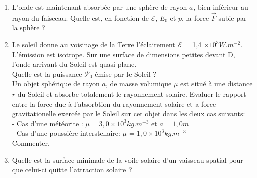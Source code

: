 \documentclass{article}
\begin{document}
\begin{enumerate}
\begin{enumerate}
    \item L'onde est maintenant absorbée par une sphère de rayon $a$, bien inférieur au rayon du faisceau. Quelle est, en fonction de $\mathcal{E}$, $E_0$ et $p$, la force $\vec{F}$ subie par la sphère ? 
    \item Le soleil donne au voisinage de la Terre l'éclairement $\mathcal{E}$ = 1,4 $\times 10^3 W.m^{-2}$. L'émission est isotrope. Sur une surface de dimensions petites devant D, l'onde arrivant du Soleil est quasi plane. \\
    Quelle est la puissance $\mathcal{P_0}$ émise par le Soleil ? \\
    Un objet sphérique de rayon $a$, de masse volumique $\mu$ est situé à une distance $r$ du Soleil et absorbe totalement le rayonnement solaire. Evaluer le rapport entre la force due à l'absorbtion du rayonnement solaire et a force gravitationelle exercée par le Soleil sur cet objet dans les deux cas suivants:\\
    - Cas d'une météorite : $\mu = 3,0\times10^3 kg.m^{-3}$ et $a=1,0m$\\
    - Cas d'une poussière interstellaire: $\mu=1,0\times10^3kg.m^{-3}$
    \\ Commenter.
    \item Quelle est la surface minimale de la voile solaire d'un vaisseau spatial pour que celui-ci quitte l'attraction solaire ? 
    \end{enumerate}
\end{enumerate}
\end{document}
